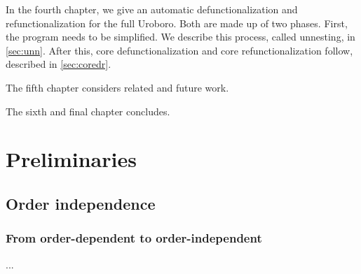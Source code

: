 In the fourth chapter, we give an automatic defunctionalization and refunctionalization for the full Uroboro. Both are made up of two phases. First, the program needs to be simplified. We describe this process, called unnesting, in \autoref{sec:unn}. After this, core defunctionalization and core refunctionalization follow, described in \autoref{sec:coredr}.

The fifth chapter considers related and future work.

The sixth and final chapter concludes.

\section{Preliminaries}
\label{sec:prel}

\subsection{Order independence}

\subsubsection{From order-dependent to order-independent}

...
